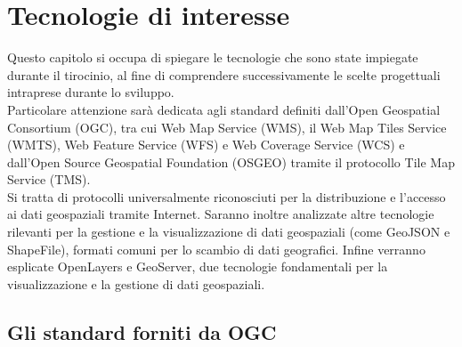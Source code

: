 \chapter{Tecnologie di interesse}
\label{cap:chapter2}

Questo capitolo si occupa di spiegare le tecnologie che sono state impiegate durante il tirocinio, al fine di comprendere successivamente le scelte progettuali intraprese durante lo sviluppo.
\\Particolare attenzione sarà dedicata agli standard definiti dall'Open Geospatial Consortium (OGC), tra cui Web Map Service (WMS), il Web Map Tiles Service (WMTS), Web Feature Service (WFS) e Web Coverage Service (WCS) e dall'Open Source Geospatial Foundation (OSGEO) tramite il protocollo Tile Map Service (TMS).
\\Si tratta di protocolli universalmente riconosciuti per la distribuzione e l'accesso ai dati geospaziali tramite Internet.
Saranno inoltre analizzate altre tecnologie rilevanti per la gestione e la visualizzazione di dati geospaziali (come GeoJSON e ShapeFile), formati comuni per lo scambio di dati geografici.
Infine verranno esplicate OpenLayers e GeoServer, due tecnologie fondamentali per la visualizzazione e la gestione di dati geospaziali.

\section{Gli standard forniti da OGC}

